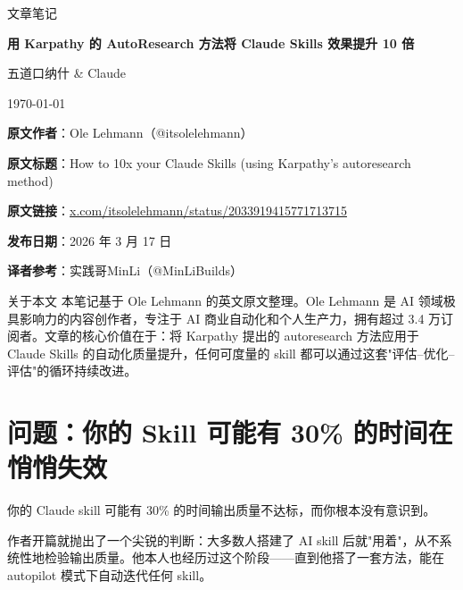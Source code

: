 \documentclass[a4paper]{article}
\newcommand{\notetitle}{用 Karpathy 的 AutoResearch 方法将 Claude Skills 效果提升 10 倍}
\newcommand{\noteauthors}{五道口纳什 \& Claude}
\newcommand{\notedate}{\today}
\begin{document}
\begin{titlepage}
\centering
{\Large 文章笔记\par}
\vspace{1.2cm}
{\huge\bfseries \notetitle\par}
\vspace{0.8cm}
{\large \noteauthors\par}
\vspace{0.3cm}
{\large \notedate\par}
\vspace{1.5cm}

\begin{tcolorbox}[width=0.9\textwidth, colback=black!2!white, colframe=black!60, sharp corners]
\textbf{原文作者}：Ole Lehmann（@itsolelehmann）\par
\textbf{原文标题}：How to 10x your Claude Skills (using Karpathy's autoresearch method)\par
\textbf{原文链接}：\href{https://x.com/itsolelehmann/status/2033919415771713715}{x.com/itsolelehmann/status/2033919415771713715}\par
\textbf{发布日期}：2026 年 3 月 17 日\par
\textbf{译者参考}：实践哥MinLi（@MinLiBuilds）
\end{tcolorbox}

\vspace{1cm}
\begin{knowledgebox}{关于本文}
本笔记基于 Ole Lehmann 的英文原文整理。Ole Lehmann 是 AI 领域极具影响力的内容创作者，专注于 AI 商业自动化和个人生产力，拥有超过 3.4 万订阅者。文章的核心价值在于：将 Karpathy 提出的 autoresearch 方法应用于 Claude Skills 的自动化质量提升，任何可度量的 skill 都可以通过这套"评估--优化--评估"的循环持续改进。
\end{knowledgebox}

\end{titlepage}

\tableofcontents
\newpage


\section{问题：你的 Skill 可能有 30\% 的时间在悄悄失效}

你的 Claude skill 可能有 30\% 的时间输出质量不达标，而你根本没有意识到。

作者开篇就抛出了一个尖锐的判断：大多数人搭建了 AI skill 后就"用着"，从不系统性地检验输出质量。他本人也经历过这个阶段——直到他搭了一套方法，能在 autopilot 模式下自动迭代任何 skill。
\end{document}
